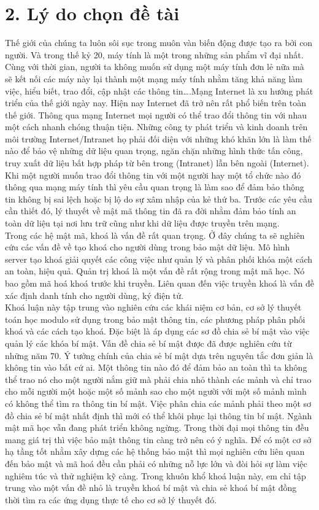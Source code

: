 \documentclass[12pt,a4paper]{report}
\begin{document}
\section*{2. Lý do chọn đề tài}
Thế giới của chúng ta luôn sôi sục trong muôn vàn biến động được tạo ra bởi con người. Và trong thế kỷ 20, máy tính là một trong những sản phẩm vĩ đại nhất. Cùng với thời gian, người ta không muốn sử dụng một máy tính đơn lẻ nữa mà sẽ kết nối các máy này lại thành một mạng máy tính nhằm tăng khả năng làm việc, hiểu biết, trao đổi, cập nhật các thông tin….Mạng Internet là xu hướng phát triển của thế giới ngày nay. Hiện nay Internet đã trở nên rất phổ biến trên toàn thế giới. Thông qua mạng Internet  mọi người có thể trao đổi thông tin với nhau một cách nhanh chóng thuận tiện. Những công ty phát triển và kinh doanh trên môi trường Internet/Intranet họ phải đối diện với những khó khăn lớn là làm thế nào để bảo vệ những dữ liệu quan trọng, ngăn chặn những hình thức tấn công, truy xuất dữ liệu bất hợp pháp từ bên trong (Intranet) lẫn bên ngoài (Internet). Khi một người muốn trao đổi thông tin với một người hay một tổ chức nào đó thông qua mạng máy tính thì yêu cầu quan trọng là làm sao để đảm bảo thông tin không bị sai lệch hoặc bị lộ do sự xâm nhập của kẻ thứ ba. Trước các yêu cầu cần thiết đó, lý thuyết về mật mã thông tin đã ra đời nhằm đảm bảo tính an toàn dữ liệu tại nơi lưu trữ cũng như khi dữ liệu được truyền trên mạng. 
\\Trong các hệ mật mã, khoá là vấn đề rất quan trọng. Ở đây chúng ta sẽ nghiên cứu các vấn đề về tạo khoá cho người dùng trong bảo mật dữ liệu. Mô hình server tạo khoá giải quyết các công việc như quản lý và phân phối khóa một cách an toàn, hiệu quả. Quản trị khoá là một vấn đề rất rộng trong mật mã học. Nó bao gồm mã hoá khoá trước khi truyền. Liên quan đến việc truyền khoá là vấn đề xác định danh tính cho người dùng, ký điện tử. 
\\Khoá luận này tập trung vào nghiên cứu các khái niệm cơ bản, cơ sở lý thuyết toán học modulo sử dụng trong bảo mật thông tin, các phương pháp phân phối khoá và các cách tạo khoá. Đặc biệt là áp dụng các sơ đồ chia sẻ bí mật vào việc quản lý các khóa bí mật.
Vấn đề chia sẻ bí mật được đã được nghiên cứu từ những năm 70. Ý tưởng chính của chia sẻ bí mật dựa trên nguyên tắc đơn giản là không tin vào bất cứ ai. Một thông tin nào đó để đảm bảo an toàn thì ta không thể trao nó cho một người nắm giữ mà phải chia nhỏ thành các mảnh và chỉ trao cho mỗi người một hoặc một số mảnh sao cho một người với một số mảnh mình có không thể tìm ra thông tin bí mật. Việc phân chia các mảnh phải theo một sơ đồ chia sẻ bí mật nhất định thì mới có thể khôi phục lại thông tin bí mật. 
Ngành mật mã học vẫn đang phát triển không ngừng. Trong thời đại mọi thông tin đều mang giá trị thì việc bảo mật thông tin càng trở nên có ý nghĩa. Để có một cơ sở hạ tầng tốt nhằm xây dựng các hệ thống bảo mật thì mọi nghiên cứu liên quan đến bảo mật và mã hoá đều cần phải có những nỗ lực lớn và đòi hỏi sự làm việc nghiêm túc và thử nghiệm kỹ càng. Trong khuôn khổ khoá luận này, em chỉ tập trung vào một vấn đề nhỏ là truyền khoá bí mật và chia sẻ khoá bí mật đồng thời tìm ra các ứng dụng thực tế cho cơ sở lý thuyết đó.
\end{document}
